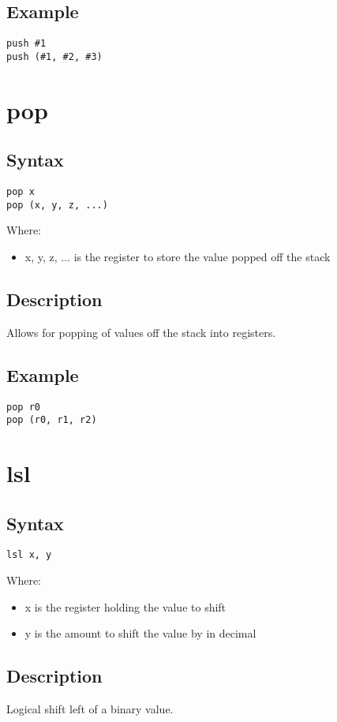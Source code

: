\documentclass[11pt]{scrartcl}
\begin{document}
\subsection{Example}
\begin{verbatim}
push #1
push (#1, #2, #3)
\end{verbatim}

\section{pop}
\subsection{Syntax}
\begin{verbatim}
pop x
pop (x, y, z, ...)
\end{verbatim}
Where:
\begin{itemize}
    \item x, y, z, ... is the register to store the value popped off the stack
\end{itemize}
\subsection{Description}
Allows for popping of values off the stack into registers.
\subsection{Example}
\begin{verbatim}
pop r0
pop (r0, r1, r2)
\end{verbatim}

\section{lsl}
\subsection{Syntax}
\begin{verbatim}
lsl x, y
\end{verbatim}
Where:
\begin{itemize}
    \item x is the register holding the value to shift
    \item y is the amount to shift the value by in decimal
\end{itemize}
\subsection{Description}
Logical shift left of a binary value.
\end{document}
